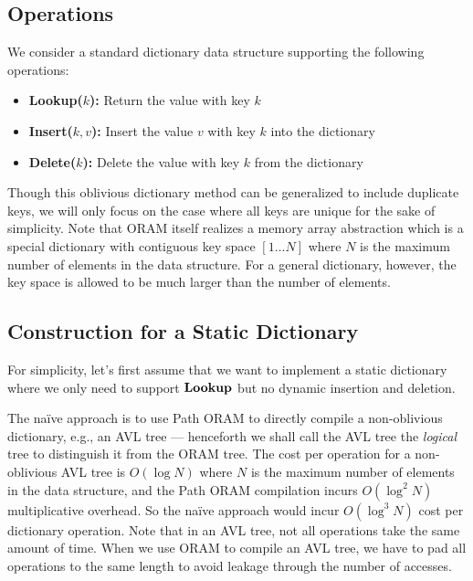 \documentclass[11pt]{article}
\begin{document}
\subsection{Operations}
We consider a standard dictionary data structure
supporting the following operations: 
\begin{itemize}
    \item \textbf{Lookup($k$):} Return the value with key $k$
    \item \textbf{Insert($k, v$):} Insert the value $v$ with key $k$ into the dictionary
    \item \textbf{Delete($k$):} Delete the value with key $k$ from the dictionary
\end{itemize}
Though this oblivious dictionary method can be generalized to include duplicate keys, we will only focus on the case where all keys are unique for the sake of simplicity. Note that ORAM itself 
realizes a memory array abstraction which is 
a special dictionary with contiguous key space $[1\ldots N]$
where $N$ is the maximum number of elements in the data structure.
For a general dictionary, however, the key space is allowed
to be much larger than the number of elements.


\subsection{Construction for a Static Dictionary}
For simplicity, let's first assume
that we want to implement a static dictionary 
where we only need to support ${\bf Lookup}$ but no dynamic insertion
and deletion. 

The na\"ive approach is to use Path ORAM to directly compile a non-oblivious
dictionary, e.g., an AVL tree --- henceforth we shall
call the AVL tree the {\it logical} tree to distinguish
it from the ORAM tree.
The cost per operation for a non-oblivious AVL tree is $O(\log N)$
where $N$ is the maximum number of elements in the data structure, 
and the Path ORAM
compilation incurs $O(\log^2 N)$ multiplicative overhead.
So the na\"ive approach would incur $O(\log^3 N)$ 
cost per dictionary operation. Note that 
in an AVL tree, not all operations
take the same amount of time. 
When we use ORAM to compile an AVL tree, we have to pad all operations to
the same length to avoid leakage through the number of 
accesses.
\end{document}
